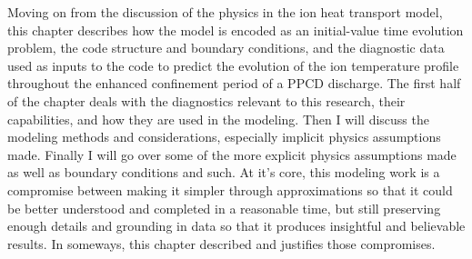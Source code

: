  Moving on from the discussion of the physics in the ion heat transport model, this chapter describes how the model is encoded as an initial-value time evolution problem, the code structure and boundary conditions, and the diagnostic data used as inputs to the code to predict the evolution of the ion temperature profile throughout the enhanced confinement period of a PPCD discharge. %
 The first half of the chapter deals with the diagnostics relevant to this research, their capabilities, and how they are used in the modeling. Then I will discuss the modeling methods and considerations, especially implicit physics assumptions made. Finally I will go over some of the more explicit physics assumptions made as well as boundary conditions and such. 
 At it's core, this modeling work is a compromise between making it simpler through approximations so that it could be better understood and completed in a reasonable time, but still preserving enough details and grounding in data so that it produces insightful and believable results. In someways, this chapter described and justifies those compromises. 

